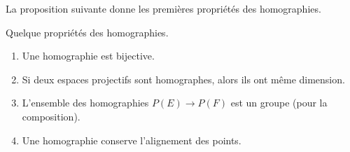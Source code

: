 La proposition suivante donne les premières propriétés des homographies.
\begin{proposition}
    Quelque propriétés des homographies.
    \begin{enumerate}
        \item
            Une homographie est bijective.
        \item
            Si deux espaces projectifs sont homographes, alors ils ont même dimension.
        \item
            L'ensemble des homographies \( P(E)\to P(F)\) est un groupe (pour la composition).
        \item
            Une homographie conserve l'alignement des points.
    \end{enumerate}
\end{proposition}

